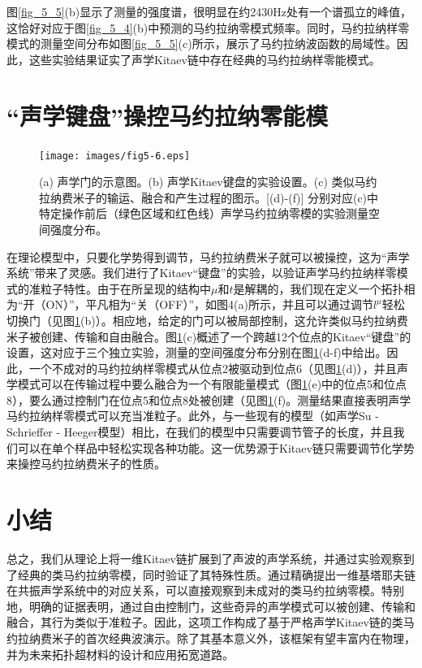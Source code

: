 图\ref{fig_5_5}(b)显示了测量的强度谱，很明显在约2430Hz处有一个谱孤立的峰值，这恰好对应于图\ref{fig_5_4}(b)中预测的马约拉纳零模式频率。同时，马约拉纳样零模式的测量空间分布如图\ref{fig_5_5}(c)所示，展示了马约拉纳波函数的局域性。因此，这些实验结果证实了声学Kitaev链中存在经典的马约拉纳样零能模式。

\section{“声学键盘”操控马约拉纳零能模}

\begin{figure}[h!]
    \centering
    \texttt{[image: images/fig5-6.eps]} 
    \caption{(a) 声学门的示意图。(b) 声学Kitaev键盘的实验设置。(c) 类似马约拉纳费米子的输运、融合和产生过程的图示。[(d)-(f)] 分别对应(c)中特定操作前后（绿色区域和红色线）声学马约拉纳零模的实验测量空间强度分布。}
    \label{fig_5_6}
\end{figure}
在理论模型中，只要化学势得到调节，马约拉纳费米子就可以被操控，这为“声学系统”带来了灵感。我们进行了Kitaev“键盘”的实验，以验证声学马约拉纳样零模式的准粒子特性\cite{r32}。由于在所呈现的结构中\(\mu\)和\(t\)是解耦的，我们现在定义一个拓扑相为“开（ON）”，平凡相为“关（OFF）”，如图4(a)所示，并且可以通过调节\(l^{\mu}\)轻松切换门（见图\ref{fig_5_6}(b)）。相应地，给定的门可以被局部控制，这允许类似马约拉纳费米子被创建、传输和自由融合。图\ref{fig_5_6}(c)概述了一个跨越12个位点的Kitaev“键盘”的设置，这对应于三个独立实验，测量的空间强度分布分别在图\ref{fig_5_6}(d-f)中给出。因此，一个不成对的马约拉纳样零模式从位点2被驱动到位点6（见图\ref{fig_5_6}(d)），并且声学模式可以在传输过程中要么融合为一个有限能量模式（图\ref{fig_5_6}(e)中的位点5和位点8），要么通过控制门在位点5和位点8处被创建（见图\ref{fig_5_6}(f)。测量结果直接表明声学马约拉纳样零模式可以充当准粒子。此外，与一些现有的模型（如声学Su - Schrieffer - Heeger模型）相比，在我们的模型中只需要调节管子的长度，并且我们可以在单个样品中轻松实现各种功能。这一优势源于Kitaev链只需要调节化学势来操控马约拉纳费米子的性质。

\section{小结}
总之，我们从理论上将一维Kitaev链扩展到了声波的声学系统，并通过实验观察到了经典的类马约拉纳零模，同时验证了其特殊性质。通过精确提出一维基塔耶夫链在共振声学系统中的对应关系，可以直接观察到未成对的类马约拉纳零模。特别地，明确的证据表明，通过自由控制门，这些奇异的声学模式可以被创建、传输和融合，其行为类似于准粒子。因此，这项工作构成了基于严格声学Kitaev链的类马约拉纳费米子的首次经典波演示。除了其基本意义外，该框架有望丰富内在物理，并为未来拓扑超材料的设计和应用拓宽道路。